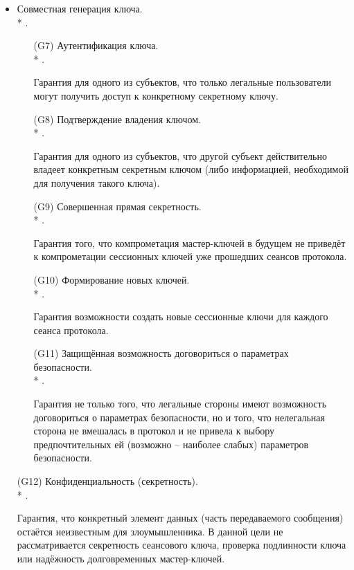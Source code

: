 \begin{itemize}
	\item Совместная генерация ключа.\\*
		.
	\begin{itemize}
		\item[(G7)] Аутентификация ключа.\\*
			.
		\item[{}] Гарантия для одного из субъектов, что только легальные пользователи могут получить доступ к конкретному секретному ключу.
		\item[(G8)] Подтверждение владения ключом.\\*
			.
		\item[{}] Гарантия для одного из субъектов, что другой субъект действительно владеет конкретным секретным ключом (либо информацией, необходимой для получения такого ключа).
		\item[(G9)] Совершенная прямая секретность.\\*
			.
		\item[{}] Гарантия того, что компрометация мастер-ключей в будущем не приведёт к компрометации сессионных ключей уже прошедших сеансов протокола.
		\item[(G10)] Формирование новых ключей.\\*
			.
		\item[{}] Гарантия возможности создать новые сессионные ключи для каждого сеанса протокола. 
		\item[(G11)] Защищённая возможность договориться о параметрах безопасности.\\*
			.
		\item[{}] Гарантия не только того, что легальные стороны имеют возможность договориться о параметрах безопасности, но и того, что нелегальная сторона не вмешалась в протокол и не привела к выбору предпочтительных ей (возможно -- наиболее слабых) параметров безопасности.
	\end{itemize}

	\item[(G12)] Конфиденциальность (секретность).\\*
		.
	\item[{}] Гарантия, что конкретный элемент данных (часть передаваемого сообщения) остаётся неизвестным для злоумышленника. В данной цели не рассматривается секретность сеансового ключа, проверка подлинности ключа или надёжность долговременных мастер-ключей.


\end{itemize}
